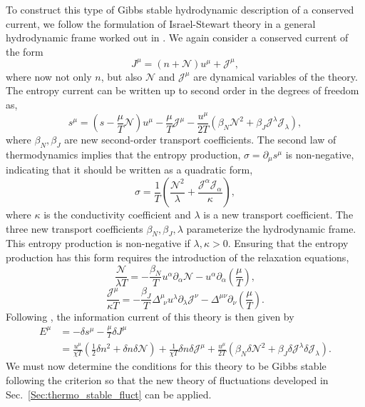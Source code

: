 \documentclass[aps,prd,nofootinbib,amsmath,amssymb,showpacs,longbibliography,singlecolumn,superscriptaddress,notitlepage]{revtex4-1}
\theoremstyle{plain}
\theoremstyle{definition}
\begin{document}
To construct this type of Gibbs stable hydrodynamic description of a conserved current, we follow the formulation of Israel-Stewart theory \cite{MIS-6} in a general hydrodynamic frame worked out in \cite{Noronha:2021syv}. We again consider a conserved current of the form 
\begin{equation}
    J^{\mu} = (n + \mathcal{N}) u^{\mu} + \mathcal{J}^{\mu} ,
\end{equation}
where now not only $n$, but also  $\mathcal{N}$ and $\mathcal{J}^{\mu}$ are dynamical variables of the theory. The entropy current can be written up to second order in the degrees of freedom as,
\begin{equation}
    s^{\mu} = \left( s - \frac{\mu}{T} \mathcal{N} \right) u^{\mu} - \frac{\mu}{T} \mathcal{J}^{\mu} - \frac{u^{\mu}}{2T} \left( \beta_N \mathcal{N}^2 + \beta_J \mathcal{J}^{\lambda} \mathcal{J}_{\lambda} \right) ,
\end{equation}
where $\beta_N, \beta_J$ are new second-order transport coefficients. The second law of thermodynamics implies that the entropy production, $\sigma = \partial_{\mu} s^{\mu}$ is non-negative, indicating that it should be written as a quadratic form,
\begin{equation}
    \sigma = \frac{1}{T} \left( \frac{\mathcal{N}^2}{\lambda} + \frac{\mathcal{J}^{\alpha} \mathcal{J}_{\alpha}}{\kappa} \right) , 
\end{equation}
where $\kappa$ is the conductivity coefficient and $\lambda$ is a new transport coefficient. The three new transport coefficients $\beta_N, \beta_J, \lambda$ parameterize the hydrodynamic frame. This entropy production is non-negative if $\lambda, \kappa > 0$. Ensuring that the entropy production has this form requires the introduction of the relaxation equations, 
\begin{equation}
    \frac{\mathcal{N}}{\lambda T} = -\frac{\beta_N}{T} u^{\alpha} \partial_{\alpha} \mathcal{N} - u^{\alpha} \partial_{\alpha} \left( \frac{\mu}{T} \right) ,
\end{equation}
\begin{equation}
    \frac{\mathcal{J}^{\mu}}{\kappa T} = -\frac{\beta_J}{T} \Delta^{\mu}_{\:\: \nu} u^{\lambda} \partial_{\lambda} \mathcal{J}^{\nu} - \Delta^{\mu\nu} \partial_{\nu} \left( \frac{\mu}{T} \right) .
\end{equation}
Following \cite{Gavassino:2021kjm}, the information current of this theory is then given by 
\begin{equation}
    \begin{split}
        E^{\mu} & = -\delta s^{\mu} - \frac{\mu}{T} \delta J^{\mu} \\
        & = \frac{u^{\mu}}{\chi T} \left( \frac{1}{2} \delta n^2 + \delta n \delta \mathcal{N} \right) + \frac{1}{\chi T} \delta n \delta \mathcal{J}^{\mu} + \frac{u^{\mu}}{2T} \left( \beta_N \delta \mathcal{N}^2 + \beta_J \delta \mathcal{J}^{\lambda} \delta \mathcal{J}_{\lambda} \right) .
    \end{split}
\end{equation}
We must now determine the conditions for this theory to be Gibbs stable following the criterion \cite{Gavassino:2021cli} so that the new theory of fluctuations developed in Sec.\ \ref{Sec:thermo_stable_fluct} can be applied.
\end{document}
